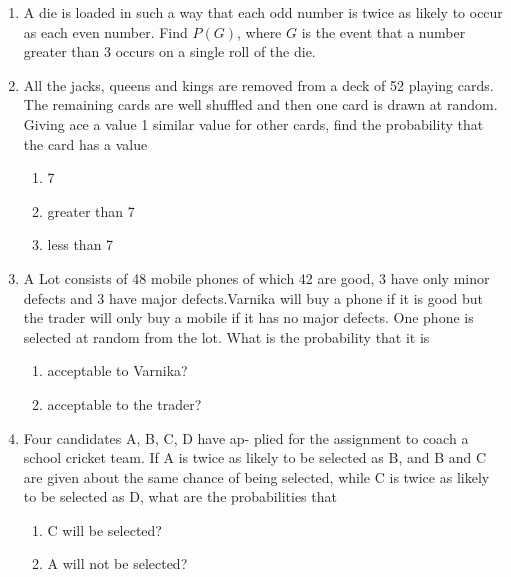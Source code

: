 \begin{enumerate}[label=\thesection.\arabic*,ref=\thesection.\theenumi]
	\item  A die is loaded in such a way that each odd number is twice as likely to occur as
each even number. Find $P(G)$, where $G$ is the event that a number greater than
3 occurs on a single roll of the die.
\\
\solution
		
	\item All the jacks, queens and kings are removed from a deck of 52 playing cards. The remaining cards are well shuffled and then one card is drawn at random. Giving ace a value 1 similar value for other cards, find the probability that the card has a value 
		\begin{enumerate}
			\item 7
			\item greater than 7
			\item less than 7
		\end{enumerate}
		
  \item A Lot consists of 48 mobile phones of which 42 are good, 3 have only minor defects and 3 have major defects.Varnika will buy a phone if it is good but the trader will only buy a mobile if it has no major defects. One phone is selected at random from the lot. What is the probability that it is
\begin{enumerate}
	\item acceptable to Varnika?
            \item acceptable to the trader?
\end{enumerate}
\solution
	
   \item Four candidates A, B, C, D have ap-
plied for the assignment to coach a school cricket
team. If A is twice as likely to be selected as B, and
B and C are given about the same chance of being
selected, while C is twice as likely to be selected
as D, what are the probabilities that
\begin{enumerate}
\item C will be selected?
\item A will not be selected?
\end{enumerate}
	
\end{enumerate}